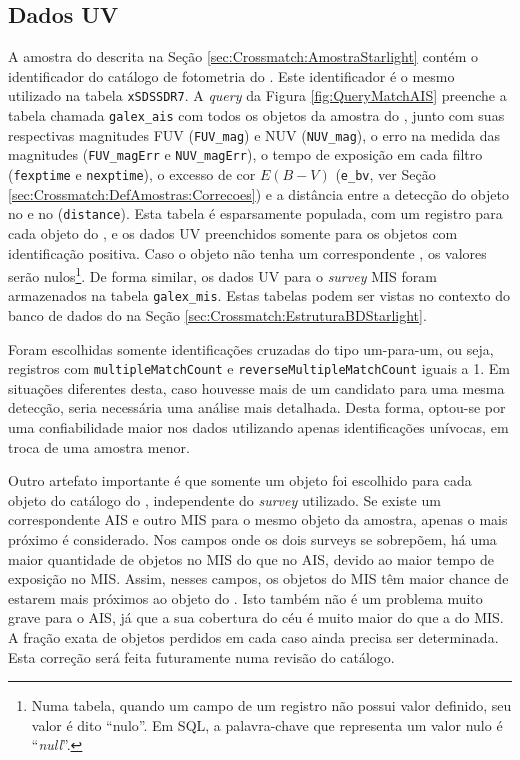 \subsection{Dados UV}

A amostra do \starlight descrita na Seção \ref{sec:Crossmatch:AmostraStarlight}
contém o identificador do catálogo de fotometria do \SDSS. Este identificador é
o mesmo utilizado na tabela \texttt{xSDSSDR7}. A {\em query} da Figura
\ref{fig:QueryMatchAIS} preenche a tabela chamada \texttt{galex\_ais} com todos
os objetos da amostra do \starlight, junto com suas respectivas magnitudes FUV
(\texttt{FUV\_mag}) e NUV (\texttt{NUV\_mag}), o erro na medida das magnitudes
(\texttt{FUV\_magErr} e \texttt{NUV\_magErr}), o tempo de exposição em cada
filtro (\texttt{fexptime} e \texttt{nexptime}), o excesso de cor $E(B-V)$
(\texttt{e\_bv}, ver Seção \ref{sec:Crossmatch:DefAmostras:Correcoes}) e a
distância entre a detecção do objeto no \galex e no \SDSS (\texttt{distance}).
Esta tabela é esparsamente populada, com um registro para cada objeto do
\starlight, e os dados UV preenchidos somente para os objetos com identificação
positiva. Caso o objeto não tenha um correspondente \galex, os valores serão
nulos\footnote{Numa tabela, quando um campo de um registro não possui valor
definido, seu valor é dito ``nulo''. Em SQL, a palavra-chave que representa um
valor nulo é ``{\em null}''.}. De forma similar, os dados UV para o {\em survey}
MIS foram armazenados na tabela \texttt{galex\_mis}. Estas tabelas podem ser
vistas no contexto do banco de dados do \starlight na Seção
\ref{sec:Crossmatch:EstruturaBDStarlight}.

Foram escolhidas somente identificações cruzadas do tipo um-para-um, ou seja,
registros com \texttt{multipleMatchCount} e \texttt{reverseMultipleMatchCount}
iguais a 1. Em situações diferentes desta, caso houvesse mais de um candidato
para uma mesma detecção, seria necessária uma análise mais detalhada. Desta
forma, optou-se por uma confiabilidade maior nos dados utilizando apenas
identificações unívocas, em troca de uma amostra menor.

Outro artefato importante é que somente um objeto \galex foi escolhido para cada
objeto do catálogo do \starlight, independente do {\em survey} utilizado. Se
existe um correspondente AIS e outro MIS para o mesmo objeto da amostra, apenas
o mais próximo é considerado. Nos campos onde os dois {surveys} se sobrepõem, há
uma maior quantidade de objetos no MIS do que no AIS, devido ao maior tempo de
exposição no MIS. Assim, nesses campos, os objetos do MIS têm maior chance de
estarem mais próximos ao objeto do \SDSS. Isto também não é um problema muito
grave para o AIS, já que a sua cobertura do céu é muito maior do que a do MIS. A
fração exata de objetos perdidos em cada caso ainda precisa ser determinada.
Esta correção será feita futuramente numa revisão do catálogo.

